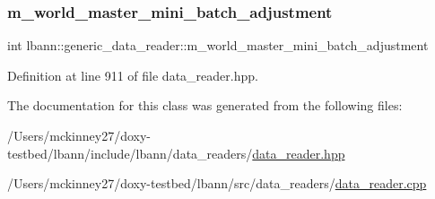 \subsubsection{\texorpdfstring{m\+\_\+world\+\_\+master\+\_\+mini\+\_\+batch\+\_\+adjustment}{m\_world\_master\_mini\_batch\_adjustment}}
{\footnotesize\ttfamily int lbann\+::generic\+\_\+data\+\_\+reader\+::m\+\_\+world\+\_\+master\+\_\+mini\+\_\+batch\+\_\+adjustment\hspace{0.3cm}{\ttfamily [protected]}}



Definition at line 911 of file data\+\_\+reader.\+hpp.



The documentation for this class was generated from the following files\+:\begin{DoxyCompactItemize}
\item 
/\+Users/mckinney27/doxy-\/testbed/lbann/include/lbann/data\+\_\+readers/\hyperlink{data__reader_8hpp}{data\+\_\+reader.\+hpp}\item 
/\+Users/mckinney27/doxy-\/testbed/lbann/src/data\+\_\+readers/\hyperlink{data__reader_8cpp}{data\+\_\+reader.\+cpp}\end{DoxyCompactItemize}
